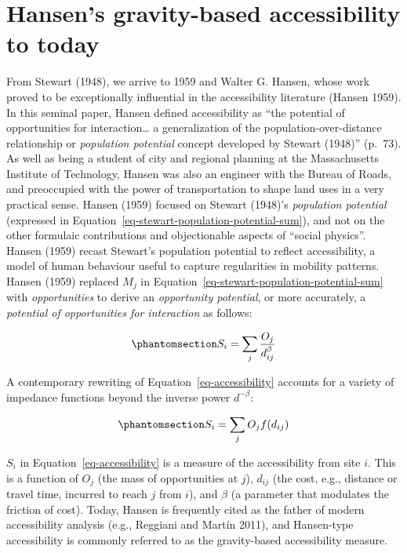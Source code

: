 \documentclass[
]{article}
\begin{document}
\section{Hansen's gravity-based accessibility to
today}\label{grav-to-today}

From Stewart (1948), we arrive to 1959 and Walter G. Hansen, whose work
proved to be exceptionally influential in the accessibility literature
(Hansen 1959). In this seminal paper, Hansen defined accessibility as
``the potential of opportunities for interaction\ldots{} a
generalization of the population-over-distance relationship or
\emph{population potential} concept developed by Stewart (1948)''
(p.~73). As well as being a student of city and regional planning at the
Massachusetts Institute of Technology, Hansen was also an engineer with
the Bureau of Roads, and preoccupied with the power of transportation to
shape land uses in a very practical sense. Hansen (1959) focused on
Stewart (1948)'s \emph{population potential} (expressed in
Equation~\ref{eq-stewart-population-potential-sum}), and not on the
other formulaic contributions and objectionable aspects of ``social
physics''. Hansen (1959) recast Stewart's population potential to
reflect accessibility, a model of human behaviour useful to capture
regularities in mobility patterns. Hansen (1959) replaced \(M_j\) in
Equation~\ref{eq-stewart-population-potential-sum} with
\emph{opportunities} to derive an \emph{opportunity potential}, or more
accurately, a \emph{potential of opportunities for interaction} as
follows:

\begin{equation}\phantomsection\label{eq-accessibility}{
S_{i} = \sum_j \frac{O_j }{d_{ij}^\beta}
}\end{equation}

A contemporary rewriting of Equation~\ref{eq-accessibility} accounts for
a variety of impedance functions beyond the inverse power
\(d^{-\beta}\):

\begin{equation}\phantomsection\label{eq-accessibility-general}{
S_{i} = \sum_j O_j  f(d_{ij})
}\end{equation}

\(S_{i}\) in Equation~\ref{eq-accessibility} is a measure of the
accessibility from site \(i\). This is a function of \(O_j\) (the mass
of opportunities at \(j\)), \(d_{ij}\) (the cost, e.g., distance or
travel time, incurred to reach \(j\) from \(i\)), and \(\beta\) (a
parameter that modulates the friction of cost). Today, Hansen is
frequently cited as the father of modern accessibility analysis (e.g.,
Reggiani and Martín 2011), and Hansen-type accessibility is commonly
referred to as the gravity-based accessibility measure.
\end{document}
